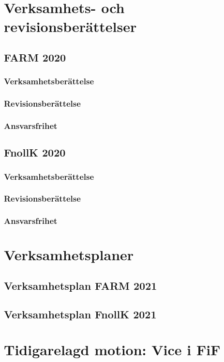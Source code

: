 \documentclass[hidelinks]{sektionsmote}
\begin{document}
\section{Verksamhets- och revisionsberättelser}
\subsection{FARM 2020}
\subsubsection{Verksamhetsberättelse}
\subsubsection{Revisionsberättelse}
\subsubsection{Ansvarsfrihet}


\subsection{FnollK 2020}
\subsubsection{Verksamhetsberättelse}
\subsubsection{Revisionsberättelse}
\subsubsection{Ansvarsfrihet}


\section{Verksamhetsplaner}
\subsection{Verksamhetsplan FARM 2021}


\subsection{Verksamhetsplan FnollK 2021}


\section{Tidigarelagd motion: Vice i FiF}
\end{document}
